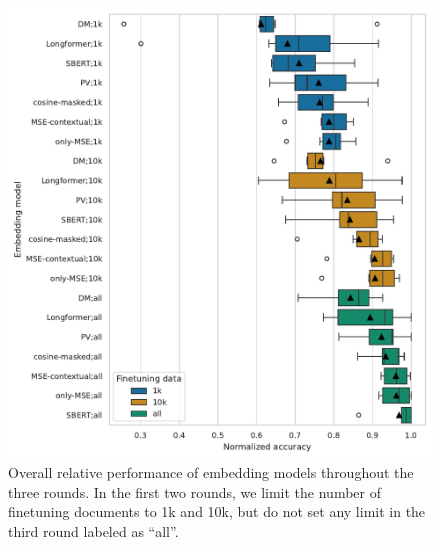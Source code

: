 \begin{figure}

  \includegraphics[width=\textwidth]{img/final_eval_norm_all.pdf}

  \caption{Overall relative performance of embedding models throughout the three
  rounds. In the first two rounds, we limit the number of finetuning documents to 1k
  and 10k, but do not set any limit in the third round labeled as ``all''.}

  \label{fig:final_eval_norm_all}

\end{figure}

